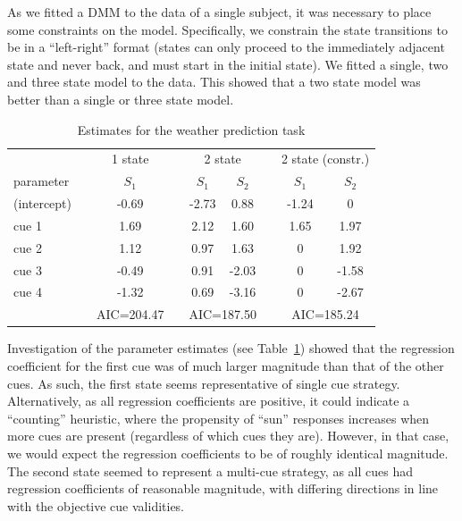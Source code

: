 \documentclass[a4paper,12pt,man,english]{apa} %
\begin{document}
As we fitted a DMM to the data of a single subject, it was necessary
to place some constraints on the model.  Specifically, we constrain
the state transitions to be in a ``left-right'' format (states can
only proceed to the immediately adjacent state and never back, and
must start in the initial state).  We fitted a single, two and three
state model to the data.  This showed that a two state model was
better than a single or three state model.

\begin{table}
\caption{Estimates for the weather prediction task}
\label{tab:WPT}
\begin{tabular}{lcccccccc} \hline
 & & \multicolumn{1}{c}{1 state} & & \multicolumn{2}{c}{2 state} &&
 \multicolumn{2}{c}{2 state (constr.)} \\ \cline{3-3} \cline{5-6} \cline{8-9}
parameter & & $S_1$ & & $S_1$ & $S_2$ & & $S_1$ & $S_2$ \\ \hline
(intercept) & & -0.69 & & -2.73 & 0.88 & & -1.24 & 0 \\
cue 1 && 1.69 && 2.12 & 1.60 && 1.65 & 1.97 \\
cue 2 && 1.12 && 0.97 & 1.63 && 0 & 1.92 \\
cue 3 && -0.49 && 0.91 & -2.03 && 0 & -1.58 \\
cue 4 && -1.32 && 0.69 & -3.16 && 0 & -2.67 \\ \hline
 & & \multicolumn{1}{c}{AIC=204.47} & & \multicolumn{2}{c}{AIC=187.50} &&
 \multicolumn{2}{c}{AIC=185.24}
\end{tabular}
\end{table}

Investigation of the parameter estimates (see Table~\ref{tab:WPT})
showed that the regression coefficient for the first cue was of much
larger magnitude than that of the other cues.  As such, the first
state seems representative of single cue strategy.  Alternatively, as
all regression coefficients are positive, it could indicate a
``counting'' heuristic, where the propensity of ``sun'' responses
increases when more cues are present (regardless of which cues they
are).  However, in that case, we would expect the regression
coefficients to be of roughly identical magnitude.  The second state
seemed to represent a multi-cue strategy, as all cues had regression
coefficients of reasonable magnitude, with differing directions in
line with the objective cue validities.
\end{document}

